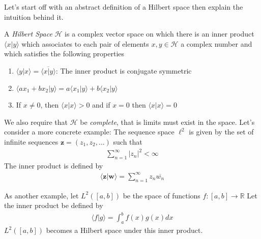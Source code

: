 \documentclass[book.tex]{subfiles}
\begin{document}
Let's start off with an abstract definition of a Hilbert space then explain the intuition behind it.


A \textit{Hilbert Space} $\mathcal{H}$ is a complex vector space on which there is an inner product $\langle x | y \rangle$ which associates to each pair of elements $x, y \in \mathcal{H}$ a complex number and which satisfies the following properties

\begin{enumerate}
    \item $\langle y | x \rangle = \overline{\langle x | y \rangle}$: The inner product is conjugate symmetric
    \item $\langle a x_1 + b x_2 | y \rangle = a \langle x_1 | y \rangle + b \langle x_2 | y \rangle$
    \item If $x \neq 0$, then $\langle x | x \rangle > 0$ and if $x = 0$ then $\langle x | x \rangle = 0$
\end{enumerate}

We also require that $\mathcal{H}$ be \textit{complete}, that is limits must exist in the space. Let's consider a more concrete example: The sequence space $\ell^2$ is given by the set of infinite sequences $\mathbf{z} = (z_1, z_2, \dotsc)$ such that
\begin{align}
\sum_{n=1}^\infty |z_n|^2 < \infty
\end{align}
The inner product is defined by
\begin{align}
\langle \mathbf{z} | \mathbf{w} \rangle = \sum_{n=1}^\infty z_n \overline{w_n}
\end{align}

As another example, let $L^2([a, b])$ be the space of functions $f:[a, b] \to \mathbb{R}$ Let the inner product be defined by
\begin{align}
\langle f | g \rangle = \int_a^b f(x)g(x) dx
\end{align}
$L^2([a, b])$ becomes a Hilbert space under this inner product.





\end{document}
